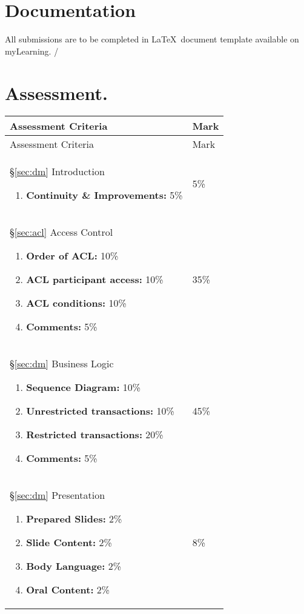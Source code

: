 \section{Documentation}\label{sec:doc}
All submissions are to be completed in \LaTeX\ document template available on myLearning. 
/
\section*{Assessment.}\label{sec:sa}
\setcounter{LTchunksize}{12}
\begin{longtable}{| p{120mm} | p{10mm} |}
\hline 
 Assessment Criteria & Mark\\ 
\hline \hline
\endfirsthead

\hline
 Assessment Criteria & Mark\\ 
\hline \hline
\endhead

\S\ref{sec:dm} Introduction
\begin{enumerate}
	\item {\bf Continuity \& Improvements:} 5\%
\end{enumerate}
& 5\% \\ \hline

\S\ref{sec:acl} Access Control 
\begin{enumerate}
	\item {\bf Order of ACL:} 10\%
	\item {\bf ACL participant access:} 10\%
	\item {\bf ACL conditions:} 10\%
	\item {\bf Comments:} 5\%
\end{enumerate}
& 35\% \\ \hline

\S\ref{sec:dm} Business Logic 
\begin{enumerate}
	\item {\bf Sequence Diagram:} 10\%
	\item {\bf Unrestricted transactions:} 10\%
	\item {\bf Restricted transactions:} 20\%
	\item {\bf Comments:} 5\%
\end{enumerate}
& 45\% \\ \hline

\S\ref{sec:dm} Presentation 
\begin{enumerate}
	\item {\bf Prepared Slides:} 2\%
	\item {\bf Slide Content:} 2\%
	\item {\bf Body Language:} 2\%
	\item {\bf Oral Content:} 2\%
\end{enumerate}
& 8\% \\ \hline



\end{longtable}
